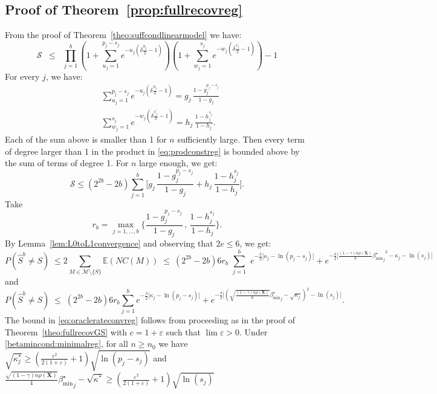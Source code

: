 \documentclass[aos]{imsart}
\theoremstyle{plain}
\newcommand{\E}{\mathbb{E}}
\newcommand{\bs}{\boldsymbol}
\begin{document}
\begin{supplement}
\subsection{Proof of Theorem~\ref{prop:fullrecovreg}}
From the proof of Theorem~\ref{theo:suffcondlinearmodel} we have:
\begin{equation}\label{eq:prodconstreg}
    \mathcal{S} \;\;\leq\;\; \prod_{j=1}^b\left(1+\sum_{u_j=1}^{p_j-s_j}e^{-u_j\left(\delta \tfrac{b_j}{2}-1\right)}\right)\left(1+
    \sum_{w_j=1}^{s_j}    e^{-w_j\left(\delta \tfrac{c^{\prime}_j}{2}-1\right)}\right) - 1
\end{equation}
For every $j$, we have:
\begin{align*}
    &\sum_{u_j=1}^{p_j-s_j}e^{-u_j\left(\delta \tfrac{b_j}{2}-1\right)}
    =g_j\,\frac{1-g_j^{p_j-s_j}}{1-g_j} \\
    &\sum_{w_j=1}^{s_j}    e^{-w_j\left(\delta \tfrac{c^{\prime}_j}{2}-1\right)} =h_j\,\frac{1-h_j^{s_j}}{1-h_j}.
\end{align*}
Each of the sum above is smaller than 1 for $n$ sufficiently large. Then every term of degree larger than 1 in the product in \eqref{eq:prodconstreg} is bounded above by the sum of terms of degree 1. For $n$ large enough, we get: 
 \begin{equation*} \mathcal{S} \leq (2^{2b}-2b)\sum_{j=1}^b \bigg[g_j\,\frac{1-g_j^{p_j-s_j}}{1-g_j}+ h_j\,\frac{1-h_j^{s_j}}{1-h_j}\bigg ]. \end{equation*} 
 Take $$r_b=\max_{j=1,\ldots,b}\bigg\{\frac{1-g_j^{p_j-s_j}}{1-g_j} \,,\,\frac{1-h_j^{s_j}}{1-h_j} \bigg\}.$$
 By Lemma~\ref{lem:L0toL1convergence} and observing that $2e \leq 6$, we get: 
 $$ P(\hat{S}^{b} \neq S)\;\leq  2 \sum_{M \in \mathcal{M}\setminus \{S\}} \E\left(NC(M)\right) \;\leq\ (2^{2b}-2b)6r_b\,\,\sum_{j=1}^b\,\, e^{-\tfrac{\delta}{2}\big[\kappa_j-\ln(p_j-s_j)\big]} + e^{-\tfrac{\delta}{2}\big[\frac{(1-\gamma) n\rho(\bs X)}{8}{{\beta_{\min}^{\star}}_j}^2 - \kappa_j -\ln(s_j) \big]} $$ and 
 $$ P(\hat{S}^{b} \neq S)\;\leq \;(2^{2b}-2b)6r_b\sum_{j=1}^b e^{-\tfrac{\delta}{2}\big[\kappa_j-\ln(p_j-s_j)\big]} + e^{-\frac{\delta}{2}\big[(\sqrt{\frac{(1-\gamma) n\rho(\bs X)}{8}}{{\beta_{\min}^{\star}}_j} - \sqrt{\kappa_j})^2 -\ln(s_j) \big]}.$$
     The bound in \eqref{eq:oraclerateconvreg} follows from proceeding as in the proof of Theorem~\ref{theo:fullrecovGS} with $c=1+\varepsilon$ such that $\lim \varepsilon > 0$. Under \eqref{betamincond:minimalreg}, for all $n\geq n_0$  we have $\sqrt{\kappa^*_j} \geq  (\frac{\varepsilon^2}{2(1+\varepsilon)}+1)\sqrt{\ln(p_j-s_j)}$ and $\frac{\sqrt{(1-\gamma) n\rho(\bs X)}}{4}{{\beta_{\min}^{\star}}_j}-\sqrt{\kappa^*} \geq (\frac{\varepsilon^2}{2(1+\varepsilon)}+1)\sqrt{\ln(s_j)}$

\end{supplement}
\end{document}
